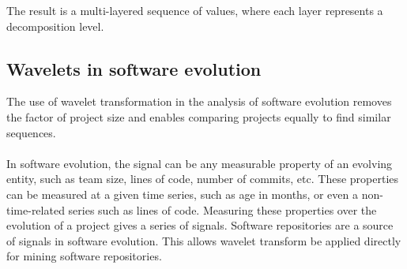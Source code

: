 The result is a multi-layered sequence of values, where each layer represents a
decomposition level.

\subsection{Wavelets in software evolution}
The use of wavelet transformation in the analysis of software evolution removes
the factor of project size and enables comparing projects equally to find
similar sequences.

\paragraph{}
In software evolution, the signal can be any measurable property of an evolving
entity, such as team size, lines of code, number of commits, etc.
These properties can be measured at a given time series, such as age in months,
or even a non-time-related series such as lines of code. Measuring these
properties over the evolution of a project gives a series of signals. Software
repositories are a source of signals in software evolution. This allows wavelet
transform be applied directly for mining software repositories.


\begin{comment}
This section describes the methods used to answer the research questions. A
good structure of this section often follows the sub questions by providing a
method for each.

The research method can be based on the “Scientific method”, but more creative
solutions could be defined as well. In any case, the method needs a thorough
motivation grounded in theory in order to be acceptable.

As part of the method a number of hypotheses are described. These hypotheses
will be tested by the research, using the methods described here.

An important part of this section is validation. How will you evaluate and
validate the outcomes of the research? You can look at Paul Klint’s homepage
for examples of this section as
well\footnote{http://homepages.cwi.nl/~paulk/thesesMasterSoftwareEngineering/2006/RichardKettelerij.pdf}.
\end{comment}
